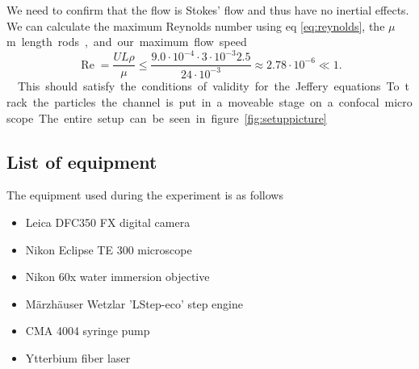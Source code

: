 \noindent We need to confirm that the flow is Stokes' flow and thus have no inertial effects. We can calculate the maximum Reynolds number using eq \ref{eq:reynolds}, the \unit[3]{$\mu$m} length rods, and our maximum flow speed.

\begin{equation}
\operatorname{Re} = \frac{U L \rho}{\mu} 
\leq \frac{9.0\cdot 10^{-4} \cdot 3 \cdot 10^{-3} 2.5 }{24 \cdot 10^{-3}} 
\approx	 	2.78  \cdot 10^{-6} \ll 1.
\end{equation}

\noindent This should satisfy the conditions of validity for the Jeffery equations. 

To track the particles the channel is put in a moveable stage on a confocal microscope. The entire setup can be seen in figure \ref{fig:setuppicture}



\subsection{List of equipment}
 The equipment used during the experiment is as follows
\begin{itemize}
\item Leica DFC350 FX digital camera 
\item Nikon Eclipse TE 300 microscope
\item Nikon 60x water immersion objective
\item Märzhäuser Wetzlar 'LStep-eco' step engine
\item CMA 4004 syringe pump
\item Ytterbium fiber laser  %
\end{itemize}

%
%
	